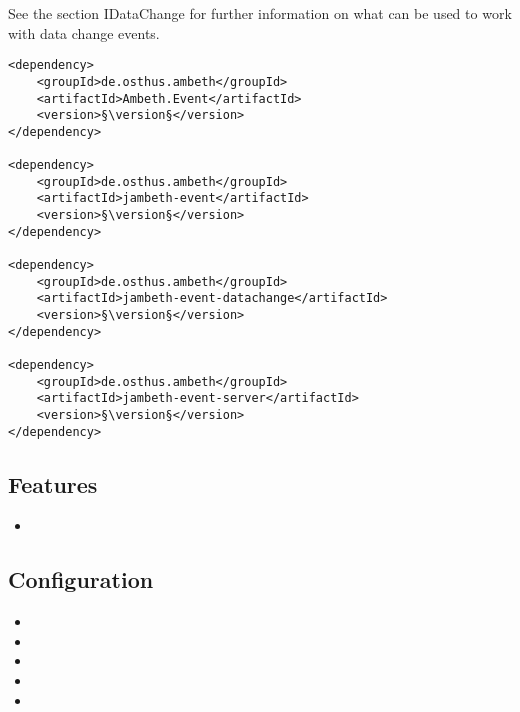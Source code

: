 See the section IDataChange for further information on what can be used to work with data change events.


\begin{lstlisting}[style=POM,caption={Maven modules to use \emph{Ambeth Event}}]
<dependency>
	<groupId>de.osthus.ambeth</groupId>
	<artifactId>Ambeth.Event</artifactId>
	<version>§\version§</version>
</dependency>

<dependency>
	<groupId>de.osthus.ambeth</groupId>
	<artifactId>jambeth-event</artifactId>
	<version>§\version§</version>
</dependency>

<dependency>
	<groupId>de.osthus.ambeth</groupId>
	<artifactId>jambeth-event-datachange</artifactId>
	<version>§\version§</version>
</dependency>

<dependency>
	<groupId>de.osthus.ambeth</groupId>
	<artifactId>jambeth-event-server</artifactId>
	<version>§\version§</version>
</dependency>
\end{lstlisting}
\subsection{Features}
\begin{itemize}
	\item \TODO
\end{itemize}

\subsection{Configuration}
\begin{itemize}
	\item {}
	\item {}
	\item {}
	\item {}
	\item {}
\end{itemize}

